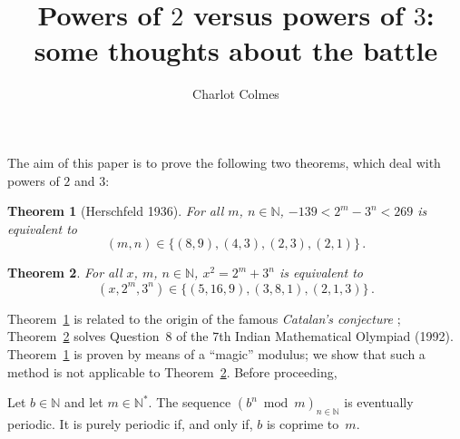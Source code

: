 \documentclass[12pt]{article}
\newcommand{\bZ}{\mathbb{Z}}
\newcommand{\bN}{\mathbb{N}} %
\newcommand{\bNast}{\bN^*}
\newtheorem{theorem}{Theorem}
\theoremstyle{definition}
\begin{document}
 \title{Powers of $2$ versus powers of $3$: some thoughts about the battle}
 \author{Charlot Colmes}
 \maketitle 


 The aim of this paper is to prove the following two theorems, which deal with powers of $2$ and $3$:

   \begin{theorem}[Herschfeld 1936] \label{thm:2m-moins-3n}
     For all $m$, $n \in \bN$,
     $- 139 < 2^m - 3^n  < 269$ is equivalent to
     $$
     (m, n) \in \{ (8, 9), (4, 3), (2, 3), (2, 1)  \} \, .
     $$
   \end{theorem}

   
   \begin{theorem} \label{thm:IndMO}
     For all $x$, $m$, $n \in \bN$,
     $x^2 = 2^m + 3^n$ is equivalent to
     $$
     (x, 2^m, 3^n) \in \{  (5, 16, 9), (3, 8, 1), (2, 1, 3) \} \, .
     $$
   \end{theorem}

   Theorem~\ref{thm:2m-moins-3n} is related to the origin
   of the famous \emph{Catalan's conjecture} \cite{Ribenboim-Catalan,Herschfeld36};
   Theorem~\ref{thm:IndMO} solves Question~$8$ of the $7$th Indian Mathematical Olympiad (1992).
   Theorem~\ref{thm:2m-moins-3n} is proven by means of a ``magic'' modulus;
   we show that such a method is not applicable to Theorem~\ref{thm:IndMO}.
   Before proceeding,

   Let $b \in \bN$ and let $m \in \bNast$.
   The sequence $\left( b^n \bmod m \right)_{n \in \bN}$ is eventually periodic.
   It is purely periodic if, and only if, $b$ is coprime to~$m$.
   
\end{document}
